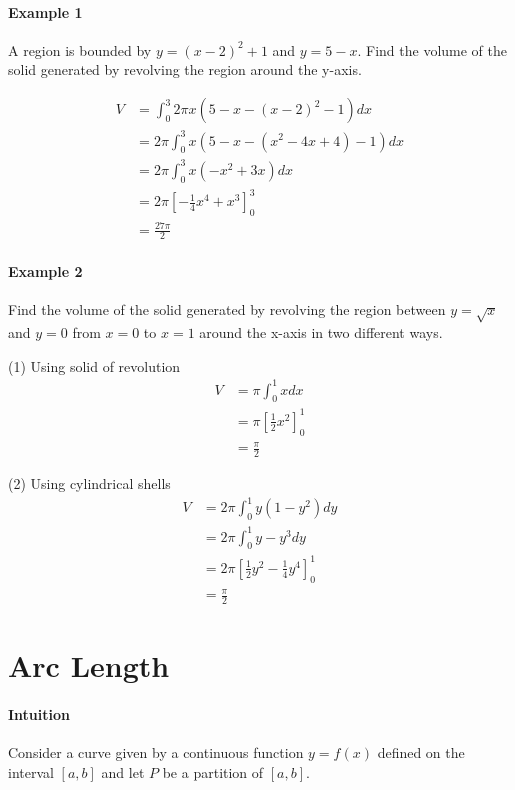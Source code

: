 \documentclass[12pt]{article}
\begin{document}
\paragraph{Example 1}
A region is bounded by $y = (x - 2)^2 + 1$ and $y = 5 - x$. Find the
volume of the solid generated by revolving the region around the y-axis.

\begin{align*} 
    V &= \int_0^3 2 \pi x (5 - x - (x - 2)^2 - 1) dx \\
    &= 2\pi \int_0^3 x(5 - x - (x^2 - 4x + 4) - 1) dx \\
    &= 2\pi \int_0^3 x( - x^2 + 3x) dx \\
    &= 2\pi \left[ - \frac{1}{4} x^4 + x^3 \right]_0^3 \\
    &= \frac{27\pi}{2} 
\end{align*}

\paragraph{Example 2}
Find the volume of the solid generated by revolving the region between $y = \sqrt{x}$ and $y = 0$ from 
$x = 0$ to $x = 1$ around the x-axis in two different ways.

(1) Using solid of revolution
\begin{align*} 
     V &= \pi \int_0^1 x dx \\
     &= \pi \left[ \frac{1}{2} x^2 \right]_0^1 \\
     &= \frac{\pi}{2}
\end{align*}

(2) Using cylindrical shells
\begin{align*} 
    V &= 2 \pi \int_0^1 y(1 - y^2) dy \\ 
    &= 2 \pi \int_0^1 y - y^3 dy \\
    &= 2 \pi \left[ \frac{1}{2} y^2 - \frac{1}{4} y^4 \right]_0^1 \\
    &= \frac{\pi}{2}
\end{align*}

\section{Arc Length}
\paragraph{Intuition}
Consider a curve given by a continuous function $y = f(x)$ defined on the interval $[a, b]$ and let 
$P$ be a partition of $[a, b]$.
\end{document}
